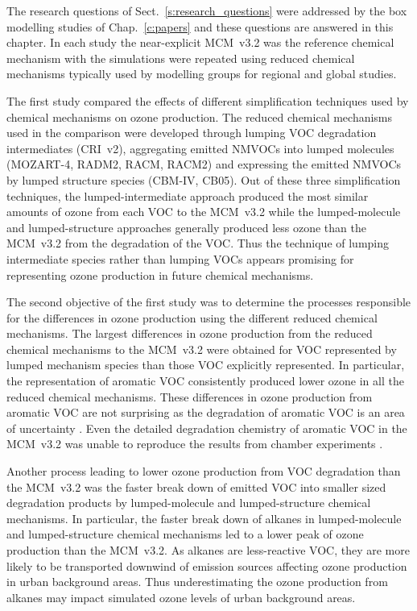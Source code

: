 The research questions of Sect.~\ref{s:research_questions} were addressed by the box modelling studies of Chap.~\ref{c:papers} and these questions are answered in this chapter.
In each study the near-explicit MCM~v3.2 was the reference chemical mechanism with the simulations were repeated using reduced chemical mechanisms typically used by modelling groups for regional and global studies.

The first study compared the effects of different simplification techniques used by chemical mechanisms on ozone production.
The reduced chemical mechanisms used in the comparison were developed through lumping VOC degradation intermediates (CRI~v2), aggregating emitted NMVOCs into lumped molecules (MOZART-4, RADM2, RACM, RACM2) and expressing the emitted NMVOCs by lumped structure species (CBM-IV, CB05).
Out of these three simplification techniques, the lumped-intermediate approach produced the most similar amounts of ozone from each VOC to the MCM~v3.2 while the lumped-molecule and lumped-structure approaches generally produced less ozone than the MCM~v3.2 from the degradation of the VOC.
Thus the technique of lumping intermediate species rather than lumping VOCs appears promising for representing ozone production in future chemical mechanisms.

The second objective of the first study was to determine the processes responsible for the differences in ozone production using the different reduced chemical mechanisms.
The largest differences in ozone production from the reduced chemical mechanisms to the MCM~v3.2 were obtained for VOC represented by lumped mechanism species than those VOC explicitly represented.
In particular, the representation of aromatic VOC consistently produced lower ozone in all the reduced chemical mechanisms.
These differences in ozone production from aromatic VOC are not surprising as the degradation of aromatic VOC is an area of uncertainty \citep{Atkinson:2003}.
Even the detailed degradation chemistry of aromatic VOC in the MCM~v3.2 was unable to reproduce the results from chamber experiments \citep{Bloss:2005}.

Another process leading to lower ozone production from VOC degradation than the MCM~v3.2 was the faster break down of emitted VOC into smaller sized degradation products by lumped-molecule and lumped-structure chemical mechanisms.
In particular, the faster break down of alkanes in lumped-molecule and lumped-structure chemical mechanisms led to a lower peak of ozone production than the MCM~v3.2.
As alkanes are less-reactive VOC, they are more likely to be transported downwind of emission sources affecting ozone production in urban background areas.
Thus underestimating the ozone production from alkanes may impact simulated ozone levels of urban background areas.

